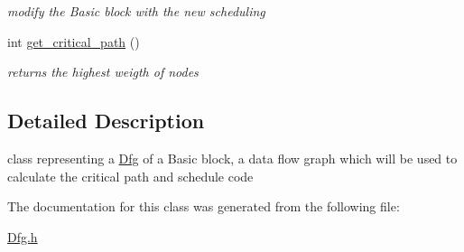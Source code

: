 \begin{DoxyCompactItemize}
\begin{DoxyCompactList}\small\item\em modify the Basic block with the new scheduling \item\end{DoxyCompactList}\item 
\hypertarget{classDfg_a568f4d0d48fc38f8fcdc4944b8d48740}{
int \hyperlink{classDfg_a568f4d0d48fc38f8fcdc4944b8d48740}{get\_\-critical\_\-path} ()}
\label{classDfg_a568f4d0d48fc38f8fcdc4944b8d48740}

\begin{DoxyCompactList}\small\item\em returns the highest weigth of nodes \item\end{DoxyCompactList}\end{DoxyCompactItemize}


\subsection{Detailed Description}
class representing a \hyperlink{classDfg}{Dfg} of a Basic block, a data flow graph which will be used to calculate the critical path and schedule code 

The documentation for this class was generated from the following file:\begin{DoxyCompactItemize}
\item 
\hyperlink{Dfg_8h}{Dfg.h}\end{DoxyCompactItemize}
